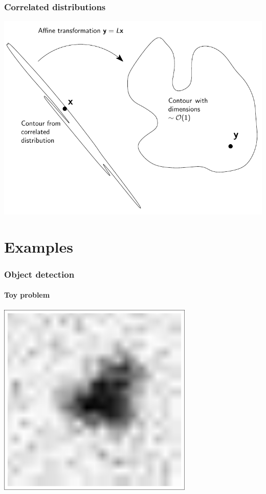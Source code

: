 \documentclass[]{beamer}
\begin{document}
\begin{frame}
  \frametitle{Correlated distributions}

  \includegraphics[width=\textwidth]{figures/contour_transform}

\end{frame}



\section{Examples}

\begin{frame}
  \frametitle{Object detection}
  \framesubtitle{Toy problem}

  \centerline{%
  \includegraphics[width=0.7\textwidth]{figures/object_detection_image}
}

\end{frame}
\end{document}
